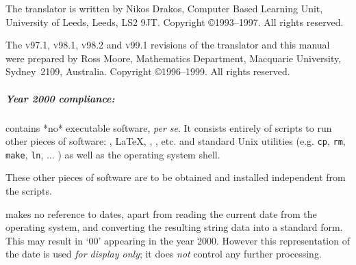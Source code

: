 \smallskip
{}\html{\\}%
The \latextohtml{} translator is written by\html{\\}
Nikos Drakos, Computer Based Learning Unit,
  University of Leeds,  Leeds,  LS2 9JT.\html{\\}
Copyright \copyright 1993--1997. All rights reserved.

\smallskip
{}\html{\\}%
The \textsc{v97.1}, \textsc{v98.1}, \textsc{v98.2}
 and \textsc{v99.1} revisions of the \latextohtml{} translator
and this manual were prepared by\html{\\}
Ross Moore, Mathematics Department,  
Macquarie University,  Sydney~2109,  Australia.\html{\\}
Copyright \copyright 1996--1999. All rights reserved.


\bigskip

\subparagraph*{Year 2000 compliance:\label{y2k}}%
%
\latextohtml{} contains *no* executable software, \emph{per se}.
It consists entirely of scripts to run other pieces of software:
\Perl, \LaTeX, , , etc.
and standard Unix utilities 
(e.g. \texttt{cp}, \texttt{rm}, \texttt{make}, \texttt{ln}, ... )
as well as the operating system shell.

These other pieces of software are to be obtained and installed
independent from the \latextohtml{} scripts.

\latextohtml{} makes no reference to dates,
apart from reading the current date from the operating system,
and converting the resulting string data into a standard form.
This may result in `00' appearing in the year 2000.
However this representation of the date is used \emph{for display only};
it does \emph{not} control any further processing.






